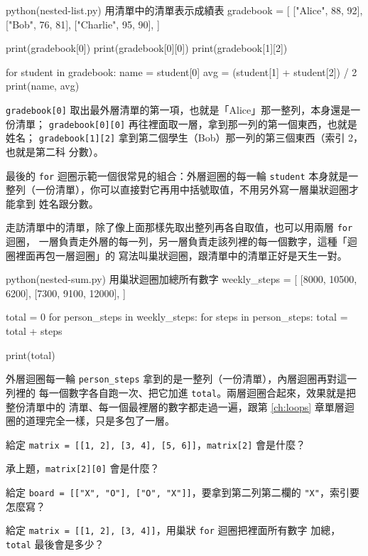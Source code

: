 \begin{example}{python}{(nested-list.py) 用清單中的清單表示成績表}
gradebook = [
    ["Alice", 88, 92],
    ["Bob", 76, 81],
    ["Charlie", 95, 90],
]

print(gradebook[0])
print(gradebook[0][0])
print(gradebook[1][2])

for student in gradebook:
    name = student[0]
    avg = (student[1] + student[2]) / 2
    print(name, avg)
\end{example}


\texttt{gradebook[0]} 取出最外層清單的第一項，也就是「Alice」那一整列，本身還是一份清單；
\texttt{gradebook[0][0]} 再往裡面取一層，拿到那一列的第一個東西，也就是姓名；
\texttt{gradebook[1][2]} 拿到第二個學生（Bob）那一列的第三個東西（索引 2，也就是第二科
分數）。

最後的 \texttt{for} 迴圈示範一個很常見的組合：外層迴圈的每一輪 \texttt{student}
本身就是一整列（一份清單），你可以直接對它再用中括號取值，不用另外寫一層巢狀迴圈才能拿到
姓名跟分數。

走訪清單中的清單，除了像上面那樣先取出整列再各自取值，也可以用兩層 \texttt{for} 迴圈，
一層負責走外層的每一列，另一層負責走該列裡的每一個數字，這種「迴圈裡面再包一層迴圈」的
寫法叫巢狀迴圈，跟清單中的清單正好是天生一對。

\begin{example}{python}{(nested-sum.py) 用巢狀迴圈加總所有數字}
weekly_steps = [
    [8000, 10500, 6200],
    [7300, 9100, 12000],
]

total = 0
for person_steps in weekly_steps:
    for steps in person_steps:
        total = total + steps

print(total)
\end{example}


外層迴圈每一輪 \texttt{person\_steps} 拿到的是一整列（一份清單），內層迴圈再對這一列裡的
每一個數字各自跑一次、把它加進 \texttt{total}。兩層迴圈合起來，效果就是把整份清單中的
清單、每一個最裡層的數字都走過一遍，跟第 \ref{ch:loops} 章單層迴圈的道理完全一樣，只是多包了一層。

\begin{drills}[label=drills:nested-list]
\item 給定 \texttt{matrix = [[1, 2], [3, 4], [5, 6]]}，\texttt{matrix[2]} 會是什麼？
\item 承上題，\texttt{matrix[2][0]} 會是什麼？
\item 給定 \texttt{board = [["X", "O"], ["O", "X"]]}，要拿到第二列第二欄的
\texttt{"X"}，索引要怎麼寫？
\item 給定 \texttt{matrix = [[1, 2], [3, 4]]}，用巢狀 \texttt{for} 迴圈把裡面所有數字
加總，\texttt{total} 最後會是多少？
\end{drills}

